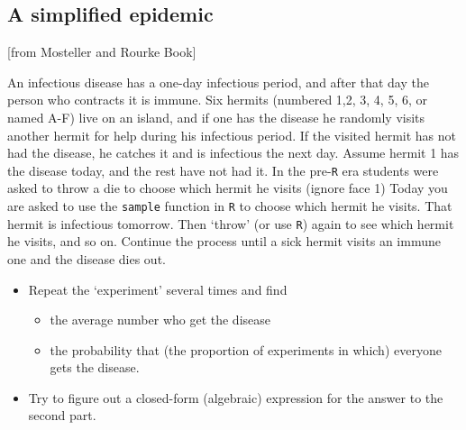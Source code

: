 \documentclass[]{book}
\providecommand{\tightlist}{%
  \setlength{\itemsep}{0pt}\setlength{\parskip}{0pt}}
\begin{document}
\hypertarget{a-simplified-epidemic}{%
\subsection{A simplified epidemic}\label{a-simplified-epidemic}}

{[}from Mosteller and Rourke Book{]}

An infectious disease has a one-day infectious period, and after that day the person who contracts it is immune. Six hermits (numbered 1,2, 3, 4, 5, 6, or named A-F) live on an island, and if one has the disease he randomly visits another hermit for help during his infectious period. If the visited hermit has not had the disease, he catches it and is infectious the next day. Assume hermit 1 has the disease today, and the rest have not had it. In the pre-\texttt{R} era students were asked to throw a die to choose which hermit he visits (ignore face 1) Today you are asked to use the \texttt{sample} function in \texttt{R} to choose which hermit he visits. That hermit is infectious tomorrow. Then `throw' (or use \texttt{R}) again to see which hermit he visits, and so on. Continue the process until a sick hermit visits an immune one and the disease dies out.

\begin{itemize}
\tightlist
\item
  Repeat the `experiment' several times and find

  \begin{itemize}
  \tightlist
  \item
    the average number who get the disease
  \item
    the probability that (the proportion of experiments in which) everyone gets the disease.
  \end{itemize}
\item
  Try to figure out a closed-form (algebraic) expression for the answer to the second part.
\end{itemize}
\end{document}
